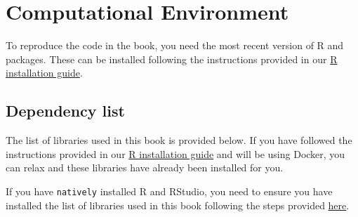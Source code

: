 \documentclass[
]{book}
\begin{document}
\hypertarget{computational-environment}{%
\section{Computational Environment}\label{computational-environment}}

To reproduce the code in the book, you need the most recent version of R and packages. These can be installed following the instructions provided in our \href{https://gdsl-ul.github.io/r_install/}{R installation guide}.

\hypertarget{dependency-list}{%
\subsection{Dependency list}\label{dependency-list}}

The list of libraries used in this book is provided below. If you have followed the instructions provided in our \href{https://gdsl-ul.github.io/r_install/}{R installation guide} and will be using Docker, you can relax and these libraries have already been installed for you.

If you have \texttt{natively} installed R and RStudio, you need to ensure you have installed the list of libraries used in this book following the steps provided \href{https://gdsl-ul.github.io/r_install/otherWin.html\#install-packages}{here}.
\end{document}

